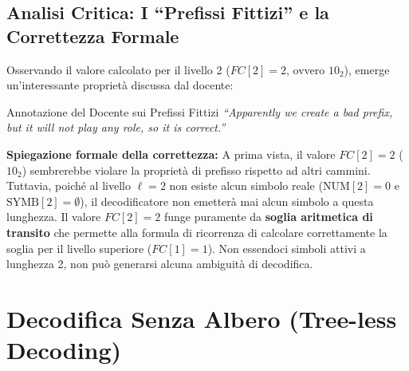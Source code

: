 \begin{table}[H]
\centering
\small
\caption{Quadro riepilogativo delle strutture canoniche: livello $\ell$, conteggio $\text{NUM}$, primo codice $FC$ e simboli associati.}
\label{tab:parametri-canonici-livello}
\end{table}

\FloatBarrier
\subsection{Analisi Critica: I ``Prefissi Fittizi'' e la Correttezza Formale}
\label{subsec:prefissi-fittizi}

Osservando il valore calcolato per il livello 2 ($FC[2] = 2$, ovvero $10_2$), emerge un'interessante propriet\`a discussa dal docente:
\begin{alertblock}{Annotazione del Docente sui Prefissi Fittizi}
\centering
\textit{``Apparently we create a bad prefix, but it will not play any role, so it is correct.''}
\end{alertblock}

\textbf{Spiegazione formale della correttezza:}
A prima vista, il valore $FC[2] = 2$ ($10_2$) sembrerebbe violare la propriet\`a di prefisso rispetto ad altri cammini. Tuttavia, poich\'e al livello $\ell = 2$ non esiste alcun simbolo reale ($\text{NUM}[2] = 0$ e $\text{SYMB}[2] = \emptyset$), il decodificatore non emetter\`a mai alcun simbolo a questa lunghezza. Il valore $FC[2] = 2$ funge puramente da \textbf{soglia aritmetica di transito} che permette alla formula di ricorrenza di calcolare correttamente la soglia per il livello superiore ($FC[1] = 1$). Non essendoci simboli attivi a lunghezza 2, non pu\`o generarsi alcuna ambiguit\`a di decodifica.

\FloatBarrier
\section{Decodifica Senza Albero (Tree-less Decoding)}
\label{sec:decodifica-tree-less}

